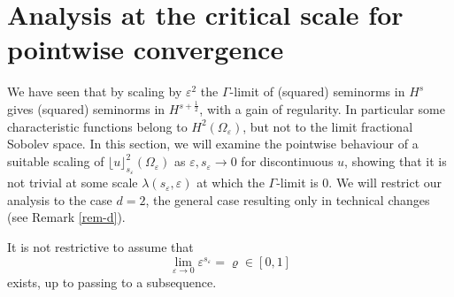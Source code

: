 \documentclass[11pt]{article}
\def\e{\varepsilon}
\begin{document}
\section{Analysis at the critical scale for pointwise convergence} 
We have seen that by scaling by $\e^2$ the $\Gamma$-limit of (squared) seminorms in $H^s$ gives (squared) seminorms in $H^{s+\frac12}$, with a gain of regularity. In particular some characteristic functions belong to $H^2(\Omega_\e)$, but not to the limit fractional Sobolev space. 
In this section, we will examine the pointwise behaviour of a suitable scaling of $\lfloor u\rfloor_{s_\e}^2(\Omega_\e) $ as $\e, s_\e\to 0$ for discontinuous $u$, showing that it is not trivial at some scale $\lambda(s_\e,\e)$ at which the $\Gamma$-limit is $0$. We will restrict our analysis to the case $d=2$, the general case resulting only in technical changes (see Remark \ref{rem-d}). 



It is not restrictive to assume that 
\begin{equation}\label{limes}
\lim_{\e\to 0}\e^{s_\e}=\varrho\in [0,1] 
\end{equation}
exists, up to passing to a subsequence. 
\end{document}
